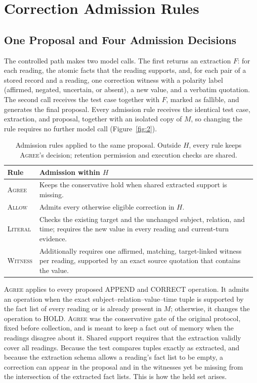 \documentclass[acmsmall,review,anonymous]{acmart}
\newcommand{\agree}{\textsc{Agree}}
\newcommand{\allow}{\textsc{Allow}}
\newcommand{\literal}{\textsc{Literal}}
\newcommand{\witness}{\textsc{Witness}}
\begin{document}
\section{Correction Admission Rules}\label{sec:rules}
\subsection{One Proposal and Four Admission Decisions}\label{sec:admission}
The controlled path makes two model calls. The first returns an extraction $F$: for each reading, the atomic facts that the reading supports, and, for each pair of a stored record and a reading, one correction witness with a polarity label (affirmed, negated, uncertain, or absent), a new value, and a verbatim quotation. The second call receives the test case together with $F$, marked as fallible, and generates the final proposal. Every admission rule receives the identical test case, extraction, and proposal, together with an isolated copy of $M$, so changing the rule requires no further model call (Figure~\ref{fig:2}).
\raggedbottom
\begin{table}[tbp]
\centering
\caption{Admission rules applied to the same proposal. Outside $H$, every rule keeps \agree{}'s decision; retention permission and execution checks are shared.}\label{tab:3}
\small
\setlength{\tabcolsep}{3pt}
\begin{tabular}{@{}>{\raggedright\arraybackslash}p{}>{\raggedright\arraybackslash}p{}@{}}
\toprule
\textbf{Rule} & \textbf{Admission within $H$} \\
\midrule
\agree{} & Keeps the conservative hold when shared extracted support is missing. \\
\allow{} & Admits every otherwise eligible correction in $H$. \\
\literal{} & Checks the existing target and the unchanged subject, relation, and time; requires the new value in every reading and current-turn evidence. \\
\witness{} & Additionally requires one affirmed, matching, target-linked witness per reading, supported by an exact source quotation that contains the value. \\
\bottomrule
\end{tabular}
\end{table}

\agree{} applies to every proposed APPEND and CORRECT operation. It admits an operation when the exact subject--relation--value--time tuple is supported by the fact list of every reading or is already present in $M$; otherwise, it changes the operation to HOLD. \agree{} was the conservative gate of the original protocol, fixed before collection, and is meant to keep a fact out of memory when the readings disagree about it. Shared support requires that the extraction validly cover all readings. Because the test compares tuples exactly as extracted, and because the extraction schema allows a reading's fact list to be empty, a correction can appear in the proposal and in the witnesses yet be missing from the intersection of the extracted fact lists. This is how the held set arises.
\end{document}
